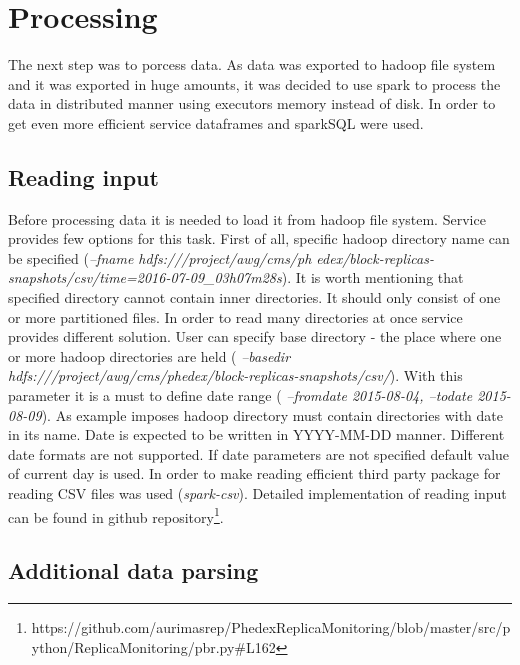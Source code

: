 \section{Processing}

The next step was to porcess data. As data was exported to hadoop file system and it was exported in huge amounts, it was decided to use spark 
to process the data in distributed manner using executors memory instead of disk. In order to get even more efficient service dataframes and 
sparkSQL were used.

\subsection{Reading input}

Before processing data it is needed to load it from hadoop file system. Service provides few options for this task. First of all, specific hadoop directory name 
can be specified (\textit{--fname hdfs:///project/awg/cms/ph edex/block-replicas-snapshots/csv/time=2016-07-09{\_}03h07m28s}). It is worth mentioning 
that specified directory cannot contain inner directories. It should only consist of one or more partitioned files. In order to read many directories 
at once service provides different solution. User can specify base directory - the place where one or more hadoop directories are held (
\textit{--basedir hdfs:///project/awg/cms/phedex/block-replicas-snapshots/csv/}). With this parameter it is a must to define date range (
\textit{--fromdate 2015-08-04, --todate 2015-08-09}). As example imposes hadoop directory must contain directories with date in its name. Date is expected 
to be written in YYYY-MM-DD manner. Different date formats are not supported. If date parameters are not specified default value of current day is used. 
In order to make reading efficient third party package for reading CSV files was used (\textit{spark-csv}). Detailed implementation of reading input can be found in 
github repository\footnote{https://github.com/aurimasrep/PhedexReplicaMonitoring/blob/master/src/python/ReplicaMonitoring/pbr.py\#L162}.

\subsection{Additional data parsing}

